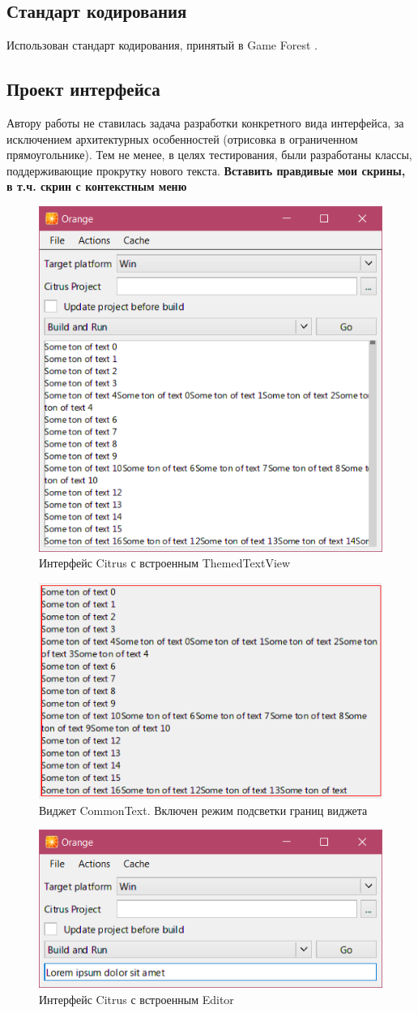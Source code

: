 \documentclass{fefu}
\begin{document}
		\subsection{Стандарт кодирования}
			Использован стандарт кодирования, принятый в Game Forest \cite{CodingConventions}.
		\subsection{Проект интерфейса}
			\par Автору работы не ставилась задача разработки конкретного вида интерфейса, за
			исключением архитектурных особенностей (отрисовка в ограниченном прямоугольнике).
			Тем не менее, в целях тестирования, были разработаны классы, поддерживающие 
			прокрутку нового текста.
			\textbf{Вставить правдивые мои скрины, в т.ч. скрин с контекстным меню}
			\begin{figure}[H]
				\centering
				\includegraphics[width=0.5\linewidth]{images/ScrollViewInt.png}
				\caption{Интерфейс Citrus с встроенным ThemedTextView}
			\end{figure}
			\begin{figure}[H]
				\centering
				\includegraphics[width=0.5\linewidth]{images/CommonTextInt.png}
				\caption{Виджет CommonText. Включен режим подсветки 
				границ виджета}
			\end{figure}
			\begin{figure}[H]
				\centering
				\includegraphics[width=0.5\linewidth]{images/EditBox.png}
				\caption{Интерфейс Citrus с встроенным Editor}
			\end{figure}
\end{document}
